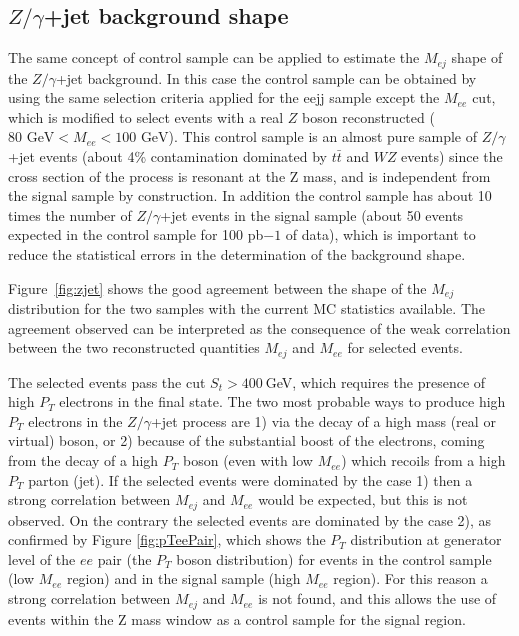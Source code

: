 \subsection{$Z/\gamma$+jet background shape} 

The same concept of control sample can be applied to estimate the $M_{ej}$ shape of the $Z/\gamma$+jet background.
In this case the control sample can be obtained by using the same selection criteria applied for the eejj sample except the $M_{ee}$ cut, which is modified to select events with a real $Z$ boson reconstructed ($80\mbox{ GeV} < M_{ee} < 100\mbox{ GeV}$). 
This control sample is an almost pure sample of  
$Z/\gamma$+jet events (about 4\% contamination dominated by $t\bar{t}$ and $WZ$ events) 
since the cross section of the process is resonant at the Z mass, and is 
independent from the signal sample by construction. In addition the control sample has about 10 times the number of $Z/\gamma$+jet events in 
the signal sample (about 50 events expected in the control sample for 100 pb$-1$ of data), which 
is important to reduce the statistical errors in the determination of the background shape.

Figure~\ref{fig:zjet} shows the good agreement between the shape of the $M_{ej}$ distribution for the two samples 
with the current MC statistics available. The agreement observed can be interpreted as the consequence of the 
weak correlation between the two reconstructed quantities $M_{ej}$ and $M_{ee}$ for selected events.  

The selected events pass the cut $S_{t}>400~$GeV, which requires the presence of high $P_{T}$ electrons in the final state. 
The two most probable ways to produce high $P_{T}$ electrons in the $Z/\gamma$+jet process are 1) via the decay of a high mass (real or virtual) boson, 
or 2) because of the substantial boost of the electrons, coming from the decay of a high $P_{T}$ boson (even with low $M_{ee}$) 
which recoils from a high $P_{T}$ parton (jet). 
If the selected events were dominated by the case 1) then a strong correlation between $M_{ej}$ and $M_{ee}$ would be expected, but this is not observed.
On the contrary the selected events are dominated by the case 2), as confirmed by Figure \ref{fig:pTeePair}, which shows the $P_{T}$
distribution at generator level of the $ee$ pair (the $P_{T}$ boson distribution) for events in the control sample (low $M_{ee}$ region) and in the signal sample (high $M_{ee}$ region).
For this reason a strong correlation between $M_{ej}$ and $M_{ee}$ is not found, and this allows the use of events within the 
Z mass window as a control sample for the signal region.

